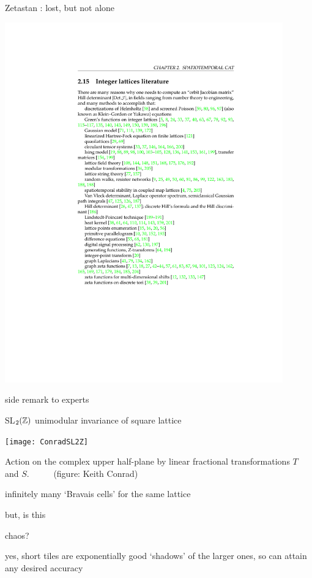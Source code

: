 \begin{frame}{Zetastan : lost, but not alone}
\begin{center}
\hfill\includegraphics[width=0.90\textwidth]{../kittens/lattLitClip2}
\end{center}
\end{frame} %

\begin{frame}{side remark to experts}
    \begin{block}{SL$_2(\mathbb{Z})$ unimodular invariance of square lattice}
\begin{center}
  \texttt{[image: ConradSL2Z]}
\end{center}
Action on the complex upper half-plane by linear
fractional transformations $T$ and $S$.
~~~~~(figure: Keith Conrad)
    \end{block}
\bigskip

infinitely many `Bravais cells' for the same lattice
\end{frame} %

\begin{frame}{but, is this}
\vfill
\begin{center}
{\huge chaos?}
\end{center}
\vfill
yes, short tiles are exponentially good `shadows' of the larger ones,
so can attain any desired accuracy
\end{frame} %

